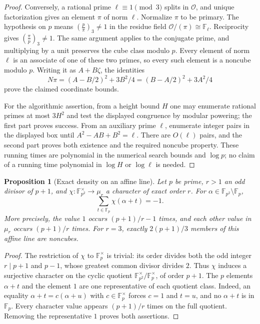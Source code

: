 \documentclass[11pt]{article}
\newtheorem{proposition}[theorem]{Proposition}
\theoremstyle{definition}
\theoremstyle{remark}
\begin{document}
\begin{proof}
Conversely, a rational prime $\ell\equiv1\pmod3$ splits in
$\mathcal O$, and unique factorization gives an element $\pi$
of norm $\ell$. Normalize $\pi$ to be primary.
The hypothesis on $p$ means
$\left(\frac{p}{\pi}\right)_3\ne1$ in the residue field
$\mathcal O/(\pi)\cong\mathbb F_\ell$.
Reciprocity gives
$\left(\frac{\pi}{p}\right)_3\ne1$.
The same argument applies to the conjugate prime, and multiplying
by a unit preserves the cube class modulo $p$. Every element of
norm $\ell$ is an associate of one of these two primes, so every
such element is a noncube modulo $p$.
Writing it as $A+B\zeta$, the identities
\[
 N\pi=(A-B/2)^2+3B^2/4
      =(B-A/2)^2+3A^2/4
\]
prove the claimed coordinate bounds.

For the algorithmic assertion, from a height bound $H$ one may
enumerate rational primes at most $3H^2$ and test the displayed
congruence by modular powering; the first part proves success.
From an auxiliary prime $\ell$, enumerate integer pairs in the
displayed box until $A^2-AB+B^2=\ell$.
There are $O(\ell)$ pairs, and the second part proves both existence
and the required noncube property. These running times are
polynomial in the numerical search bounds and $\log p$; no claim
of a running time polynomial in $\log H$ or $\log\ell$ is needed.
\end{proof}

\begin{proposition}[Exact density on an affine line]
\label{prop:quadratic-affine-character}
Let $p$ be prime, $r>1$ an odd divisor of $p+1$, and
$\chi:\mathbb F_{p^2}^{\times}\to\mu_r$ a character of exact
order $r$. For $\alpha\in\mathbb F_{p^2}\setminus\mathbb F_p$,
\[
 \sum_{t\in\mathbb F_p}\chi(\alpha+t)=-1.
\]
More precisely, the value $1$ occurs $(p+1)/r-1$ times, and each
other value in $\mu_r$ occurs $(p+1)/r$ times.
For $r=3$, exactly $2(p+1)/3$ members of this affine line are
noncubes.
\end{proposition}

\begin{proof}
The restriction of $\chi$ to $\mathbb F_p^\times$ is trivial:
its order divides both the odd integer $r\mid p+1$ and $p-1$,
whose greatest common divisor divides $2$.
Thus $\chi$ induces a surjective character on the cyclic quotient
$\mathbb F_{p^2}^\times/\mathbb F_p^\times$, of order $p+1$.
The $p$ elements $\alpha+t$ and the element $1$ are one representative
of each quotient class. Indeed, an equality
$\alpha+t=c(\alpha+u)$ with $c\in\mathbb F_p^\times$
forces $c=1$ and $t=u$, and no $\alpha+t$ is in $\mathbb F_p$.
Every character value appears $(p+1)/r$ times on the full quotient.
Removing the representative $1$ proves both assertions.
\end{proof}
\end{document}
